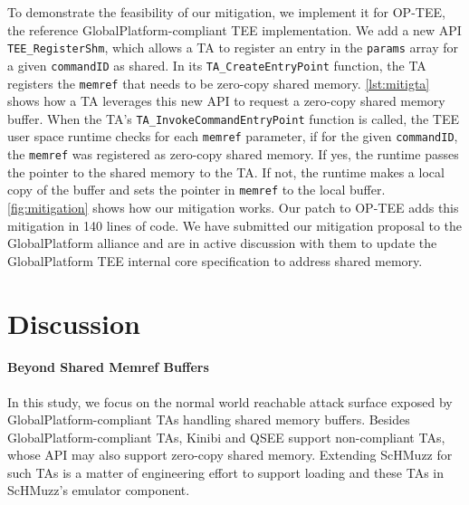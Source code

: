 \documentclass[letterpaper,twocolumn,10pt]{article}
\newcommand{\sysname}{ScHMuzz\xspace}
\newcommand{\optee}{OP-TEE\xspace}
\newcommand{\kinibi}{Kinibi\xspace}
\newcommand{\qsee}{QSEE\xspace}
\begin{document}
To demonstrate the feasibility of our mitigation, we implement it for \optee, the 
reference GlobalPlatform-compliant TEE implementation. We add a new API \texttt{TEE\_RegisterShm}, 
which allows a TA to register an entry in the \texttt{params} array for a given 
\texttt{commandID} as shared. In its \texttt{TA\_CreateEntryPoint} function, the 
TA registers the \texttt{memref} that needs to be zero-copy shared memory. 
\autoref{lst:mitigta} shows how a TA leverages this new API to request a
zero-copy shared memory buffer. When the TA's \texttt{TA\_InvokeCommandEntryPoint} function is called, the TEE user 
space runtime checks for each \texttt{memref} parameter, if for the given 
\texttt{commandID}, the \texttt{memref} was registered as zero-copy shared memory. 
If yes, the runtime passes the pointer to the shared memory to the TA. 
If not, the runtime makes a local copy of the 
buffer and sets the pointer in \texttt{memref} to the local buffer.
\autoref{fig:mitigation} shows how our mitigation works.
Our patch to \optee adds this mitigation in 140 lines 
of code.
We have submitted our mitigation proposal to the GlobalPlatform alliance and are 
in active discussion with them to update the GlobalPlatform TEE internal core 
specification to address shared memory.

\begin{listing}[h]
    
    \label{lst:mitigta}
\end{listing}

\section{Discussion}\label{sec:discussion}

\paragraph{Beyond Shared Memref Buffers}
In this study, we focus on the normal world reachable attack surface exposed by 
GlobalPlatform-compliant TAs handling shared memory buffers. 
Besides GlobalPlatform-compliant TAs, \kinibi and \qsee support non-compliant TAs, 
whose API may also support zero-copy shared memory. Extending 
\sysname for such TAs is a matter of engineering effort to support loading and 
these TAs in \sysname's emulator component. 
\end{document}
